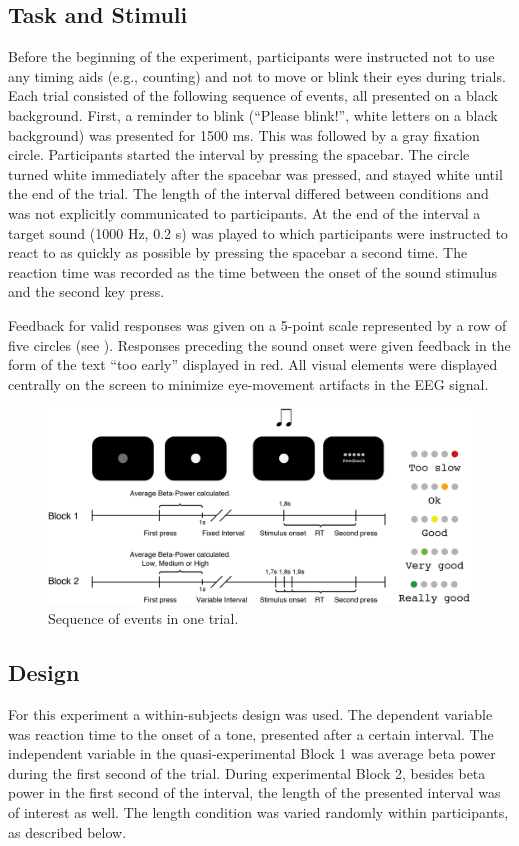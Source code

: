 \documentclass[man,floatsintext]{apa6} %
\begin{document}
\subsection{Task and Stimuli}
Before the beginning of the experiment, participants were instructed not to use any timing aids (e.g., counting) and not to move or blink their eyes during trials. Each trial consisted of the following sequence of events, all presented on a black background. First, a reminder to blink (``Please blink!'', white letters on a black background) was presented for 1500 ms. This was followed by a gray fixation circle. Participants started the interval by pressing the spacebar. The circle turned white immediately after the spacebar was pressed, and stayed white until the end of the trial. The length of the interval differed between conditions and was not explicitly communicated to participants. At the end of the interval a target sound (1000 Hz, 0.2 s) was played to which participants were instructed to react to as quickly as possible by pressing the spacebar a second time. The reaction time was recorded as the time between the onset of the sound stimulus and the second key press.

Feedback for valid responses was given on a 5-point scale represented by a row of five circles (see ). Responses preceding the sound onset were given feedback in the form of the text ``too early'' displayed in red. All visual elements were displayed centrally on the screen to minimize eye-movement artifacts in the EEG signal.

\begin{figure}[!ht]
  \includegraphics[width=\textwidth]{trial}
  \caption{Sequence of events in one trial.}
  \label{fig:task}
\end{figure}

\subsection{Design}
For this experiment a within-subjects design was used. The dependent variable was reaction time to the onset of a tone, presented after a certain interval. The independent variable in the quasi-experimental Block 1 was average beta power during the first second of the trial. During experimental Block 2, besides beta power in the first second of the interval, the length of the presented interval was of interest as well. The length condition was varied randomly within participants, as described below.
\end{document}
